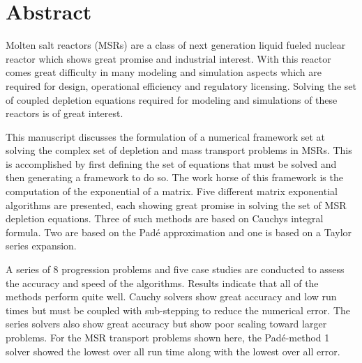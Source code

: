 \chapter*{Abstract}\label{ch:abstract}
Molten salt reactors (MSRs) are a class of next generation liquid fueled nuclear reactor which shows great promise and industrial interest. With this reactor comes great difficulty in many modeling and simulation aspects which are required for design, operational efficiency and regulatory licensing. Solving the set of coupled depletion equations required for modeling and simulations of these reactors is of great interest. 

This manuscript discusses the formulation of a numerical framework set at solving the complex set of depletion and mass transport problems in MSRs. This is accomplished by first defining the set of equations that must be solved and then generating a framework to do so. The work horse of this framework is the computation of the exponential of a matrix. Five different matrix exponential algorithms are presented, each showing great promise in solving the set of MSR depletion equations. Three of such methods are based on Cauchys integral formula. Two are based on the Pad\'e approximation and one is based on a Taylor series expansion. 

A series of 8 progression problems and five case studies are conducted to assess the accuracy and speed of the algorithms. Results indicate that all of the methods perform quite well. Cauchy solvers show great accuracy and low run times but must be coupled with sub-stepping to reduce the numerical error. The series solvers also show great accuracy but show poor scaling toward larger problems. For the MSR transport problems shown here, the Pad\'e-method 1 solver showed the lowest over all run time along with the lowest over all error. 